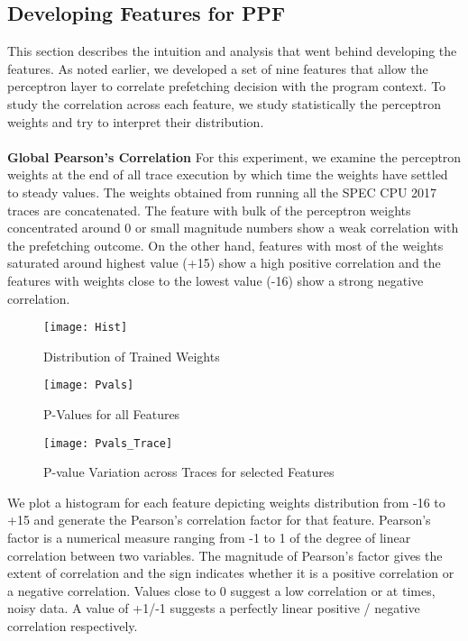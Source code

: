 \subsection{Developing Features for PPF}
\label{Method-Features}
This section describes the intuition and analysis that went behind developing
the features. As noted earlier, we developed a set of nine features that allow
the perceptron layer to correlate prefetching decision with the program
context. To study the correlation across each feature, we study statistically
the perceptron weights and try to interpret their distribution. \\ \\
%
\textbf{Global Pearson's Correlation}\newline 
For this experiment, we examine
the perceptron weights at the end of all trace execution by which time the
weights have settled to steady values. The weights obtained from running all
the SPEC CPU 2017 traces are concatenated. The feature with bulk of the
perceptron weights concentrated around 0 or small magnitude numbers show a
weak correlation with the prefetching outcome. On the other hand, features
with most of the weights saturated around highest value (+15) show a high
positive correlation and the features with weights close to the lowest value
(-16) show a strong negative correlation.

\begin{figure}[h]
  \begin{center}
    \texttt{[image: Hist]}
    \caption{Distribution of Trained Weights}
    \label{Fig:Hist}
  \end{center}
\end{figure}

\begin{figure}[h]
  \begin{center}
    \texttt{[image: Pvals]}
    \caption{P-Values for all Features}
    \label{Fig:Pvals}
  \end{center}
\end{figure}


\begin{figure}[h]
  \begin{center}
    \texttt{[image: Pvals\_Trace]}
    \caption{P-value Variation across Traces for selected Features}
    \label{Fig:Pvals_Trace}
  \end{center}
\end{figure}

We plot a histogram for each feature depicting weights distribution from -16
to +15 and generate the Pearson's correlation factor for that feature.
Pearson's factor is a numerical measure ranging from -1 to 1 of the degree of
linear correlation between two variables. The magnitude of Pearson's factor
gives the extent of correlation and the sign indicates whether it is a
positive correlation or a negative correlation. Values close to 0 suggest a
low correlation or at times, noisy data. A value of +1/-1 suggests a
perfectly linear positive / negative correlation respectively.

